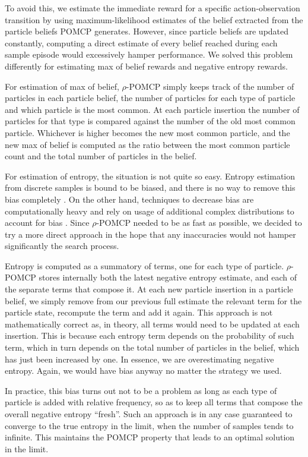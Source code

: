 To avoid this, we estimate the immediate reward for a specific action-observation transition by
using maximum-likelihood estimates of the belief extracted from the particle beliefs POMCP
generates. However, since particle beliefs are updated constantly, computing a direct estimate of
every belief reached during each sample episode would excessively hamper performance. We solved this problem
differently for estimating max of belief rewards and negative entropy rewards.

For estimation of max of belief, $\rho$-POMCP simply keeps track of the number of particles in each
particle belief, the number of particles for each type of particle and which particle is the most
common. At each particle insertion the number of particles for that type is compared against the
number of the old most common particle. Whichever is higher becomes the new most common particle,
and the new max of belief is computed as the ratio between the most common particle count and the
total number of particles in the belief.

For estimation of entropy, the situation is not quite so easy. Entropy estimation from discrete
samples is bound to be biased, and there is no way to remove this bias completely
\cite{cit:badentropy}. On the other hand, techniques to decrease bias are computationally heavy and
rely on usage of additional complex distributions to account for bias \cite{cit:entropyfixes}.
Since $\rho$-POMCP needed to be as fast as possible, we decided to try a more direct approach in the
hope that any inaccuracies would not hamper significantly the search process.

Entropy is computed as a summatory of terms, one for each type of particle. $\rho$-POMCP stores
internally both the latest negative entropy estimate, and each of the separate terms that compose
it. At each new particle insertion in a particle belief, we simply remove from our previous full
estimate the relevant term for the particle state, recompute the term and add it again. This
approach is not mathematically correct as, in theory, all terms would need to be updated at each
insertion. This is because each entropy term depends on the probability of such term, which in turn
depends on the total number of particles in the belief, which has just been increased by one. In
essence, we are overestimating negative entropy. Again, we would have bias anyway no matter the
strategy we used.

In practice, this bias turns out not to be a problem as long as each type of particle is added with
relative frequency, so as to keep all terms that compose the overall negative entropy ``fresh''.
Such an approach is in any case guaranteed to converge to the true entropy in the limit, when the
number of samples tends to infinite. This maintains the POMCP property that leads to an optimal
solution in the limit.


